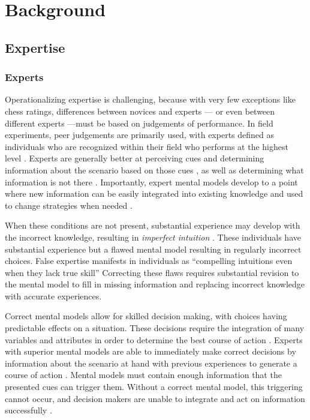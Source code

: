 
\chapter{Background}

\section{Expertise}

\subsection{Experts}

Operationalizing expertise is challenging, because with very few exceptions like chess ratings, differences between novices and experts --- or even between different experts ---must be based on judgements of performance. In field experiments, peer judgements are primarily used, with experts defined as individuals who are recognized within their field who performs at the highest level \citep{Kahneman2009}. Experts are generally better at perceiving cues and determining information about the scenario based on those cues \citep{Nee2006, Klein1999}, as well as determining what information is not there \citep{Klein1992}. Importantly, expert mental models develop to a point where new information can be easily integrated into existing knowledge and used to change strategies when needed \citep{Glaser1996}.

When these conditions are not present, substantial experience may develop with the incorrect knowledge, resulting in \emph{imperfect intuition} \citep{Kahneman2009}. These individuals have substantial experience but a flawed mental model resulting in regularly incorrect choices. False expertise manifests in individuals as ``compelling intuitions even when they lack true skill'' \citep{Kahneman2009} Correcting these flaws requires substantial revision to the mental model \citep{Klein2006, Chi2008} to fill in missing information and replacing incorrect knowledge with accurate experiences.

Correct mental models allow for skilled decision making, with choices having predictable effects on a situation. These decisions require the integration of many variables and attributes in order to determine the best course of action \citep{Klein2008}. Experts with superior mental models are able to immediately make correct decisions \citep{Klein1992} by information about the scenario at hand with previous experiences to generate a course of action \citep{Klein1999}. Mental models must contain enough information that the presented cues can trigger them. Without a correct mental model, this triggering cannot occur, and decision makers are unable to integrate and act on information successfully \citep{Lipshitz1997}.

